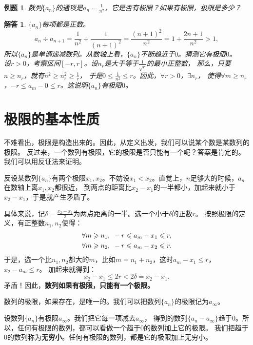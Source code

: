 \documentclass[12pt,UTF8]{ctexbook}
\newtheorem{et}{例题}[section]
\newtheorem*{so}{解答}
\begin{document}
\begin{et}
数列$\{a_n\}$的通项是$a_n = \frac{1}{n^2}$，它是否有极限？如果有极限，极限是多少？    
\end{et}
\begin{so}
    $\{a_n\}$每项都是正数。
    $$a_{n} \div a_{n+1} = \frac{1}{n^2} \div \frac{1}{(n+1)^2} = \frac{(n+1)^2}{n^2} = 1 + \frac{2n+1}{n^2} > 1,$$
    所以$\{a_n\}$是单调递减数列。从数轴上看，$\{a_n\}$不断趋近于$0$。猜测它有极限$0$。\\
    设$r>0$，考察区间$[-r,r]$。设$n_r$是大于等于$\frac{1}{\sqrt{r}}$的最小正整数，
    那么，只要$n \geqslant n_r$，就有$n^2 \geqslant n_r^2 \geqslant \frac{1}{r}$，
    于是$0 \leqslant \frac{1}{n^2} \leqslant r$。因此，$\forall r > 0$，$\exists n_r$，
    使得$\forall m \geqslant n_r$，$ -r  \leqslant a_m - 0 \leqslant r$。这说明$\{a_n\}$有极限$0$。    
\end{so}

\section{极限的基本性质}
不难看出，极限是构造出来的。因此，从定义出发，我们可以说某个数是某数列的极限。
反过来，一个数列有极限，它的极限是否只能有一个呢？答案是肯定的。我们可以用反证法来证明。

反设某数列$\{a_n\}$有两个极限$x_1, x_2$。不妨设$x_1 < x_2$。直觉上，$n$足够大的时候，$a_n$在数轴上离$x_1, x_2$都很近，
到两点的距离比$x_2 - x_1$的一半都小，加起来就小于$x_2 - x_1$，于是就产生矛盾了。

具体来说，记$\delta = \frac{x_2 - x_1}{2}$为两点距离的一半。选一个小于$\delta$的正数$r$。
按照极限的定义，有正整数$n_1, n_2$使得：
\begin{align}
    \forall m \geqslant n_1 , \,\,\,& -r \leqslant a_m - x_1 \leqslant r , \notag \\
    \forall m \geqslant n_2 , \,\,\,& -r \leqslant a_m - x_2 \leqslant r . \notag 
\end{align}
于是，选一个比$n_1,n_2$都大的$m$，比如$m=n_1+n_2$，这时$a_m - x_1 \leqslant r$，$x_2 - a_m \leqslant r$。
加起来就得到：
$$x_2 - x_1 \leqslant 2r < 2\delta = x_2 - x_1.$$
矛盾！因此，\textbf{数列如果有极限，只能有一个极限。}

数列的极限，如果存在，是唯一的。我们可以把数列$\{a_n\}$的极限记为$a_\infty$。

设数列$\{a_n\}$有极限$a_\infty$。我们把它每一项减去$a_\infty$，
得到的数列$\{a_n - a_\infty\}$趋于$0$。所以，任何有极限的数列，都可以看做一个趋于$0$的数列加上它的极限。
我们把趋于$0$的数列称为\textbf{无穷小}。任何有极限的数列，都是它的极限加上无穷小。
\end{document}
